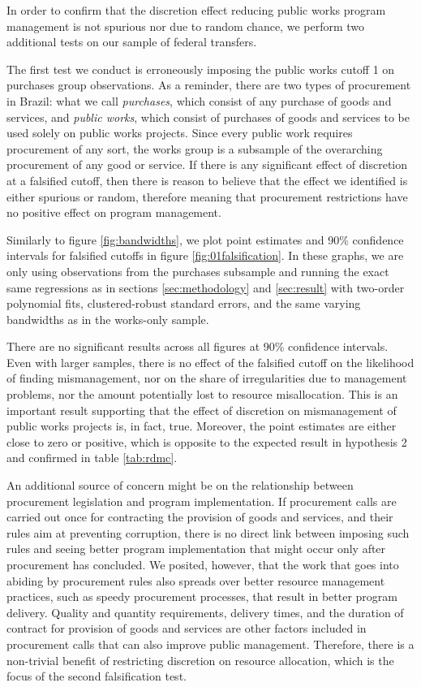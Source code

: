 \documentclass[11pt]{article}
\begin{document}
In order to confirm that the discretion effect reducing public works program management is not spurious nor due to random chance, we perform two additional tests on our sample of federal transfers.

The first test we conduct is erroneously imposing the public works cutoff 1 on  purchases group observations. As a reminder, there are two types of procurement in Brazil: what we call \emph{purchases}, which consist of any purchase of goods and services, and \emph{public works}, which consist of purchases of goods and services to be used solely on public works projects. Since every public work requires procurement of any sort, the works group is a subsample of the overarching procurement of any good or service. If there is any significant effect of discretion at a falsified cutoff, then there is reason to believe that the effect we identified is either spurious or random, therefore meaning that procurement restrictions have no positive effect on program management.

Similarly to figure \ref{fig:bandwidths}, we plot point estimates and 90\% confidence intervals for falsified cutoffs in figure \ref{fig:01falsification}. In these graphs, we are only using observations from the purchases subsample and running the exact same regressions as in sections \ref{sec:methodology} and \ref{sec:result} with two-order polynomial fits, clustered-robust standard errors, and the same varying bandwidths as in the works-only sample.


There are no significant results across all figures at 90\% confidence intervals. Even with larger samples, there is no effect of the falsified cutoff on the likelihood of finding mismanagement, nor on the share of irregularities due to management problems, nor the amount potentially lost to resource misallocation. This is an important result supporting that the effect of discretion on mismanagement of public works projects is, in fact, true. Moreover, the point estimates are either close to zero or positive, which is opposite to the expected result in hypothesis 2 and confirmed in table \ref{tab:rdmc}.

An additional source of concern might be on the relationship between procurement legislation and program implementation. If procurement calls are carried out once for contracting the provision of goods and services, and their rules aim at preventing corruption, there is no direct link between imposing such rules and seeing better program implementation that might occur only after procurement has concluded. We posited, however, that the work that goes into abiding by procurement rules also spreads over better resource management practices, such as speedy procurement processes, that result in better program delivery. Quality and quantity requirements, delivery times, and the duration of contract for provision of goods and services are other factors included in procurement calls that can also improve public management. Therefore, there is a non-trivial benefit of restricting discretion on resource allocation, which is the focus of the second falsification test.
\end{document}
